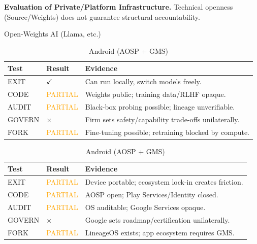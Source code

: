 \documentclass{article}
\begin{document}
\begin{table}[htbp]
    \centering
    \scriptsize
    \caption{\textbf{Evaluation of Private/Platform Infrastructure.} Technical openness (Source/Weights) does not guarantee structural accountability.}
    \label{tab:corp_infra}

    \begin{subtable}{1\textwidth}
        \centering
        \caption{Open-Weights AI (Llama, etc.)}
        \begin{tabular}{@{}llp{7cm}@{}}
            \toprule
            \textbf{Test} & \textbf{Result} & \textbf{Evidence} \\
            \midrule
            EXIT & $\checkmark$ & Can run locally, switch models freely. \\
            CODE & \textcolor{orange}{PARTIAL} & Weights public; training data/RLHF opaque. \\
            AUDIT & \textcolor{orange}{PARTIAL} & Black-box probing possible; lineage unverifiable. \\
            GOVERN & $\times$ & Firm sets safety/capability trade-offs unilaterally. \\
            FORK & \textcolor{orange}{PARTIAL} & Fine-tuning possible; retraining blocked by compute. \\
            \bottomrule
        \end{tabular}
    \end{subtable}

    \begin{subtable}{1\textwidth}
        \centering
        \caption{Android (AOSP + GMS)}
        \begin{tabular}{@{}llp{7cm}@{}}
            \toprule
            \textbf{Test} & \textbf{Result} & \textbf{Evidence} \\
            \midrule
            EXIT & \textcolor{orange}{PARTIAL} & Device portable; ecosystem lock-in creates friction. \\
            CODE & \textcolor{orange}{PARTIAL} & AOSP open; Play Services/Identity closed. \\
            AUDIT & \textcolor{orange}{PARTIAL} & OS auditable; Google Services opaque. \\
            GOVERN & $\times$ & Google sets roadmap/certification unilaterally. \\
            FORK & \textcolor{orange}{PARTIAL} & LineageOS exists; app ecosystem requires GMS. \\
            \bottomrule
        \end{tabular}
    \end{subtable}


\end{table}
\end{document}

